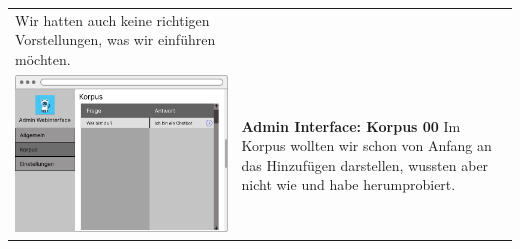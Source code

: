 \begin{tabular}{C{6cm}  L{7cm}}
    Wir hatten auch keine richtigen Vorstellungen, was wir einführen möchten. \\
    \includegraphics[width=\linewidth]{bilder/old vers. UI Design/Admin Interface (1).png} & \textbf{Admin Interface: Korpus 00} \newline 
    Im Korpus wollten wir schon von Anfang an das Hinzufügen darstellen, wussten aber nicht
    wie und habe herumprobiert.
\end{tabular}

